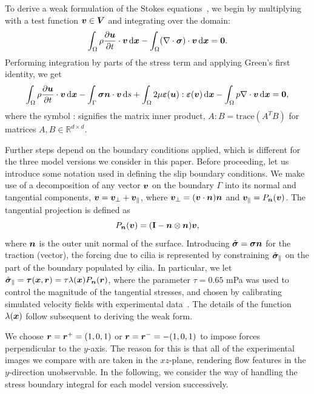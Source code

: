 \documentclass{WileyMSP-template}
\begin{document}
To derive a weak formulation of the Stokes equations~,
we begin by multiplying~ with a
test function $\bm{v}\in\bm{V}$ and integrating over the domain:
\begin{equation*}
    \int_{\Omega}\rho\frac{\partial \bm{u}}{\partial t}\cdot\bm{v} \, \mathrm d\bm{x} - \int_{\Omega}(\nabla\cdot\bm{\sigma})\cdot\bm{v} \, \mathrm d\bm{x} = \mathbf{0}.
\end{equation*}
Performing integration by parts of the stress term and applying Green's first identity, we get
\begin{equation}
    \int_{\Omega}\rho\frac{\partial \bm{u}}{\partial t}\cdot\bm{v} \, \mathrm d\bm{x}
    - \int_{\Gamma}\bm{\sigma}\bm{n}\cdot\bm{v} \, \mathrm ds
    + \int_{\Omega}2\mu\bm{\varepsilon}(\bm{u}) : \bm{\varepsilon}(\bm{v}) \, \mathrm d\bm{x}
    - \int_{\Omega}p\nabla\cdot\bm{v} \, \mathrm d\bm{x} = \mathbf{0}, \label{eq:modelA_weak_form1}
\end{equation}
where the symbol : signifies the matrix inner product,
$A:B=\text{trace}{(A^TB)}$ for matrices $A, B\in\mathbb{R}^{d\times d}$. 

Further steps depend on the boundary conditions applied,
which is different for the three model versions we consider in this paper.
Before proceeding, let us introduce some notation used in defining the
slip boundary conditions. We make use of a decomposition
of any vector $\bm{v}$ on the boundary $\Gamma$ into its normal and tangential components,
$\bm{v} = \bm{v}_{\perp} + \bm{v}_{\parallel}$, where $\bm{v}_{\perp}=(\bm{v}\cdot\bm{n})\bm{n}$ and
$\bm{v}_{\parallel}=P_{\bm{n}}(\bm{v})$. The tangential projection is defined as
\begin{equation}
    P_{\bm{n}}(\bm{v}) = (\mathbf{I} - \bm{n}\otimes\bm{n})\bm{v},
    \label{eq:projection_operator_appendix}
\end{equation}
where $\bm{n}$ is the outer unit normal of the surface. Introducing
$\hat{\bm{\sigma}} = \bm{\sigma}\bm{n}$ for the traction (vector), the forcing due
to cilia is represented by constraining $\hat{\bm{\sigma}}_{\parallel}$ on the part of the
boundary populated by cilia. In particular, we let
$\hat{\bm{\sigma}}_{\parallel} = \bm{\tau}(\bm{x}, \bm{r}) = \tau\lambda(\bm{x}) P_{\bm{n}}(\bm{r})$,
where the parameter $\tau=0.65$ mPa was used to control the magnitude
of the tangential stresses, and chosen by calibrating simulated velocity
fields with experimental data~\cite{Olstad2019CiliaryDevelopment}.
The details of the function $\lambda(\bm{x})$ follow subsequent to deriving the weak form.

We choose $\bm{r} = \bm{r}^+ = (1, 0, 1)$ or $\bm{r} = \bm{r}^- = -(1, 0, 1)$
to impose forces perpendicular to the $y$-axis.
The reason for this is that all of the experimental images we compare
with are taken in the $xz$-plane,
rendering flow features in the $y$-direction unobservable.
In the following, we consider the way of handling the stress
boundary integral for each model version successively. 
\end{document}
